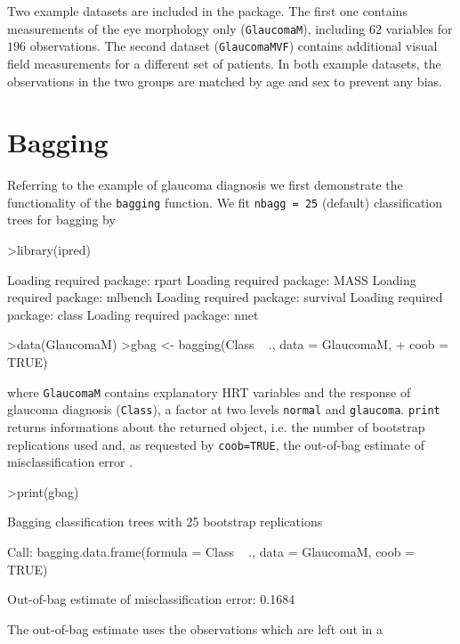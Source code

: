 \documentclass[11pt]{article}
\begin{document}
Two example datasets are included in the package. The first one contains
measurements of the eye morphology only (\texttt{GlaucomaM}), including $62$
variables for $196$ observations. The second dataset (\texttt{GlaucomaMVF})
contains additional visual field measurements for a different set of
patients. In both example datasets, the observations in the two groups are
matched by age and sex to prevent any bias.

\section{Bagging}
Referring to the example of glaucoma diagnosis we first 
demonstrate the functionality of the \texttt{bagging} function. 
We fit \texttt{nbagg = 25} (default) classification trees for bagging by 
\begin{Schunk}
\begin{Sinput}
>library(ipred)
\end{Sinput}
\begin{Soutput}
Loading required package: rpart 
Loading required package: MASS 
Loading required package: mlbench 
Loading required package: survival 
Loading required package: class 
Loading required package: nnet 
\end{Soutput}
\begin{Sinput}
>data(GlaucomaM)
>gbag <- bagging(Class ~ ., data = GlaucomaM, 
+     coob = TRUE)
\end{Sinput}
\end{Schunk}
where \texttt{GlaucomaM} contains explanatory HRT variables 
and the response of glaucoma diagnosis (\texttt{Class}), 
a factor at two levels \texttt{normal} and \texttt{glaucoma}.
\texttt{print} returns informations about the returned object,
i.e. the number of bootstrap replications used and, as requested by
\texttt{coob=TRUE}, the out-of-bag estimate of misclassification error 
\citep{out-of-bag:1996}. 
\begin{Schunk}
\begin{Sinput}
>print(gbag)
\end{Sinput}
\begin{Soutput}
Bagging classification trees with 25 bootstrap replications 

Call: bagging.data.frame(formula = Class ~ ., data = GlaucomaM, coob = TRUE)

Out-of-bag estimate of misclassification error:  0.1684 
\end{Soutput}
\end{Schunk}
The out-of-bag estimate uses the observations which are left out in a
\end{document}
